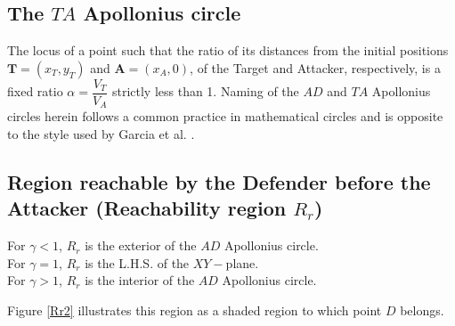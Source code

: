 \subsection{The $TA$ Apollonius circle} 
The locus of a point such that the ratio of its distances from the initial positions $\boldsymbol{T}=(x_{T},y_{T})$ and $\boldsymbol{A}=(x_{A},0)$, of the Target and Attacker, respectively, is a fixed ratio $\alpha= \dfrac{V_{T}}{V_{A}}$ strictly less than 1. Naming of the $AD$ and $TA$ Apollonius circles herein follows a common practice in mathematical circles \cite{ayoub2003proving,ayoub2006circle,partensky2008circle} and is opposite to the style used by Garcia et al. \cite{pachter2014active,garcia2015active,garcia2015escape}.

\subsection{Region reachable by the Defender before the Attacker (Reachability region $R_r$)}
For $\gamma<1$, $R_r$ is the exterior of the $AD$ Apollonius circle.\\
For $\gamma=1$, $R_r$ is the L.H.S. of the $XY-$plane.\\
For $\gamma>1$, $R_r$ is the interior of the $AD$ Apollonius circle. 

Figure \ref{Rr2} illustrates this region as a shaded region to which point $D$ belongs.

